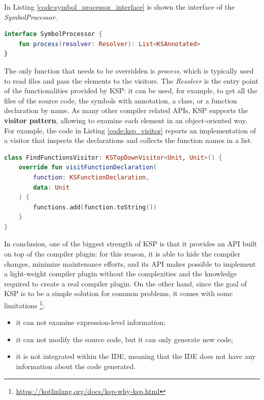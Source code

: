 In Listing \ref{code:symbol_processor_interface} is shown the interface of the \textit{SymbolProcessor}.
\begin{lstlisting}[caption={SymbolProcessor interface}, language=Kotlin, captionpos=b, label={code:symbol_processor_interface}]
interface SymbolProcessor {
    fun process(resolver: Resolver): List<KSAnnotated>
}
\end{lstlisting}
The only function that needs to be overridden is \textit{process}, which is typically used to read files and pass the elements to the visitors.\newline
The \textit{Resolver} is the entry point of the functionalities provided by KSP: it can be used, for example, to get all the files of the source code, the symbols with annotation, a class, or a function declaration by name.\newline
As many other compiler related APIs, KSP supports the \textbf{visitor pattern}, allowing to examine each element in an object-oriented way.\newline
For example, the code in Listing \ref{code:ksp_visitor} reports an implementation of a visitor that inspects the declarations and collects the function names in a list.
\begin{lstlisting}[caption={Visitor that collects function declarations}, language=Kotlin, captionpos=b, label={code:ksp_visitor}]
class FindFunctionsVisitor: KSTopDownVisitor<Unit, Unit>() {
    override fun visitFunctionDeclaration(
        function: KSFunctionDeclaration,
        data: Unit
    ) {
        functions.add(function.toString())
    }
}
\end{lstlisting}

In conclusion, one of the biggest strength of KSP is that it provides an API built on top of the compiler plugin: for this reason, it is able to hide the compiler changes, minimize maintenance efforts, and its API makes possible to implement a light-weight compiler plugin without the complexities and the knowledge required to create a real compiler plugin.\newline
On the other hand, since the goal of KSP is to be a simple solution for common problems, it comes with some limitations \footnote{\url{https://kotlinlang.org/docs/ksp-why-ksp.html}}:
\begin{itemize}
    \item it can not examine expression-level information;
    \item it can not modify the source code, but it can only generate new code;
    \item it is not integrated within the IDE, meaning that the IDE does not have any information about the code generated.
\end{itemize}

